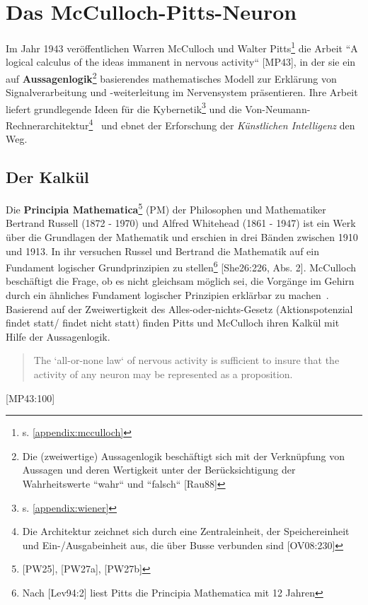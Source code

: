 \section{Das McCulloch-Pitts-Neuron}

Im Jahr 1943 veröffentlichen Warren McCulloch und Walter Pitts\footnote{
    s. \ref{appendix:mcculloch}
} die Arbeit ``A logical calculus of the ideas immanent in nervous activity`` [MP43], in der sie ein auf \textbf{Aussagenlogik}\footnote{
    Die (zweiwertige) Aussagenlogik beschäftigt sich mit der Verknüpfung von Aussagen und deren Wertigkeit unter der Berücksichtigung der Wahrheitswerte ``wahr`` und ``falsch`` [Rau88]
} basierendes mathematisches Modell zur Erklärung von Signalverarbeitung und  -weiterleitung im Nervensystem präsentieren.
Ihre Arbeit liefert grundlegende Ideen für die Kybernetik\footnote{
    s. \ref{appendix:wiener}
} und die Von-Neumann-Rechnerarchitektur\footnote{
    Die Architektur zeichnet sich durch eine Zentraleinheit, der Speichereinheit und Ein-/Ausgabeinheit aus, die über Busse verbunden sind [OV08:230]
}~\cite[1]{Arb19} und ebnet der Erforschung der \textit{Künstlichen Intelligenz} den Weg.


\subsection{Der Kalkül}

Die \textbf{Principia Mathematica}\footnote{
    [PW25], [PW27a], [PW27b]
} (PM) der Philosophen und Mathematiker Bertrand Russell (1872 - 1970) und Alfred Whitehead (1861 - 1947) ist ein Werk über die Grundlagen der Mathematik und erschien in drei Bänden zwischen 1910 und 1913. In ihr versuchen Russel und Bertrand die Mathematik auf ein Fundament logischer Grundprinzipien zu stellen\footnote{
    Nach [Lev94:2] liest Pitts die Principia Mathematica mit 12 Jahren
} [She26:226, Abs. 2].
McCulloch beschäftigt die Frage, ob es nicht gleichsam möglich sei, die Vorgänge im Gehirn durch ein ähnliches Fundament logischer Prinzipien erklärbar zu machen~\cite[4]{Arb19}. Basierend auf der Zweiwertigkeit des Alles-oder-nichts-Gesetz (Aktionspotenzial findet statt/ findet nicht statt) finden Pitts und McCulloch ihren Kalkül mit Hilfe der Aussagenlogik.\\

\blockquote{
    The `all-or-none law` of nervous activity is sufficient to insure that the activity of any neuron may be represented as a proposition.
}[MP43:100]\\

